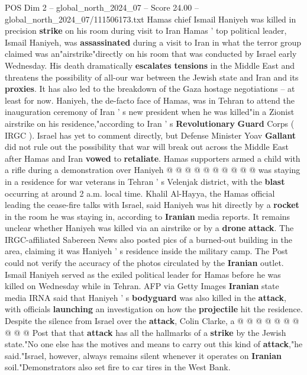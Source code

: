\begin{textsample}{POS Dim 2 – global\_north\_2024\_07 – Score 24.00 – global\_north\_2024\_07/111506173.txt}  \label{ex:f2_pos_189}
Hamas chief Ismail Haniyeh was killed in precision \textbf{strike} on his room during visit to Iran Hamas ' top political leader, Ismail Haniyeh, was \textbf{assassinated} during a visit to Iran in what the terror group claimed was an"airstrike"directly on his room that was conducted by Israel early Wednesday.
His death dramatically \textbf{escalates} \textbf{tensions} in the Middle East and threatens the possibility of all-our war between the Jewish state and Iran and its \textbf{proxies}.
It has also led to the breakdown of the Gaza hostage negotiations -- at least for now.
Haniyeh, the de-facto face of Hamas, was in Tehran to attend the inauguration ceremony of Iran ' s new president when he was killed"in a Zionist airstrike on his residence,"according to Iran ' s \textbf{Revolutionary} \textbf{Guard} Corps ( IRGC ).
Israel has yet to comment directly, but Defense Minister Yoav \textbf{Gallant} did not rule out the possibility that war will break out across the Middle East after Hamas and Iran \textbf{vowed} to \textbf{retaliate}.
Hamas supporters armed a child with a rifle during a demonstration over Haniyeh @ @ @ @ @ @ @ @ @ @ was staying in a residence for war veterans in Tehran ' s Velenjak district, with the \textbf{blast} occurring at around 2 a.m. local time.
Khalil Al-Hayya, the Hamas official leading the cease-fire talks with Israel, said Haniyeh was hit directly by a \textbf{rocket} in the room he was staying in, according to \textbf{Iranian} media reports.
It remains unclear whether Haniyeh was killed via an airstrike or by a \textbf{drone} \textbf{attack}.
The IRGC-affiliated Sabereen News also posted pics of a burned-out building in the area, claiming it was Haniyeh ' s residence inside the military camp.
The Post could not verify the accuracy of the photos circulated by the \textbf{Iranian} outlet.
Ismail Haniyeh served as the exiled political leader for Hamas before he was killed on Wednesday while in Tehran.
AFP via Getty Images \textbf{Iranian} state media IRNA said that Haniyeh ' s \textbf{bodyguard} was also killed in the \textbf{attack}, with officials \textbf{launching} an investigation on how the \textbf{projectile} hit the residence.
Despite the silence from Israel over the \textbf{attack}, Colin Clarke, a @ @ @ @ @ @ @ @ @ @ Post that that \textbf{attack} has all the hallmarks of a \textbf{strike} by the Jewish state."No one else has the motives and means to carry out this kind of \textbf{attack},"he said."Israel, however, always remains silent whenever it operates on \textbf{Iranian} soil."Demonstrators also set fire to car tires in the West Bank.

\end{textsample}
